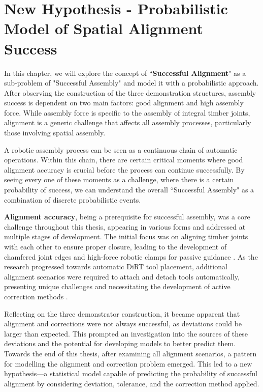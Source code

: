 \chapter{New Hypothesis - Probabilistic Model of Spatial Alignment Success}
\label{chapter:new-hypothesis}

In this chapter, we will explore the concept of ``\textbf{Successful Alignment}" as a sub-problem of "Successful Assembly" and model it with a probabilistic approach. After observing the construction of the three demonstration structures, assembly success is dependent on two main factors: good alignment and high assembly force. While assembly force is specific to the assembly of integral timber joints, alignment is a generic challenge that affects all assembly processes, particularly those involving spatial assembly.

A robotic assembly process can be seen as a continuous chain of automatic operations. Within this chain, there are certain critical moments where good alignment accuracy is crucial before the process can continue successfully. By seeing every one of these moments as a challenge, where there is a certain probability of success, we can understand the overall ``Successful Assembly" as a combination of discrete probabilistic events.

\textbf{Alignment accuracy}, being a prerequisite for successful assembly, was a core challenge throughout this thesis, appearing in various forms and addressed at multiple stages of development. The initial focus was on aligning timber joints with each other to ensure proper closure, leading to the development of chamfered joint edges and high-force robotic clamps for passive guidance . As the research progressed towards automatic DiRT tool placement, additional alignment scenarios were required to attach and detach tools automatically, presenting unique challenges and necessitating the development of active correction methods .

Reflecting on the three demonstrator construction, it became apparent that alignment and corrections were not always successful, as deviations could be larger than expected. This prompted an investigation into the sources of these deviations and the potential for developing models to better predict them. Towards the end of this thesis, after examining all alignment scenarios, a pattern for modelling the alignment and correction problem emerged. This led to a new hypothesis—a statistical model capable of predicting the probability of successful alignment by considering deviation, tolerance, and the correction method applied.

